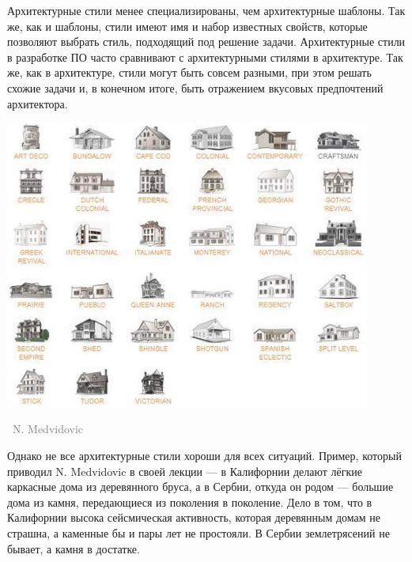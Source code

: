 \documentclass[a5paper]{article}
\newlength\Colsep
\newcommand{\attribution}[1] {
    \vspace{-4mm}\begin{flushright}\begin{scriptsize}\textcolor{gray}
    {\textcopyright\, #1}\end{scriptsize}\end{flushright}
}
\begin{document}
\noindent\begin{minipage}{\textwidth}
    \begin{minipage}[c][6cm][c]{\dimexpr0.5\textwidth-0.5\Colsep\relax}
        Архитектурные стили менее специализированы, чем архитектурные шаблоны. Так же, как и шаблоны, стили имеют имя и набор известных свойств, которые позволяют выбрать стиль, подходящий под решение задачи. Архитектурные стили в разработке ПО часто сравнивают с архитектурными стилями в архитектуре. Так же, как в архитектуре, стили могут быть совсем разными, при этом решать схожие задачи и, в конечном итоге, быть отражением вкусовых предпочтений архитектора.
    \end{minipage}\hfill
    \begin{minipage}[c][6cm][c]{\dimexpr0.5\textwidth-0.5\Colsep\relax}
        \includegraphics[width=0.9\textwidth]{buildingStyles.png}
        \attribution{N. Medvidovic}
    \end{minipage}%
\end{minipage}

Однако не все архитектурные стили хороши для всех ситуаций. Пример, который приводил N. Medvidovic в своей лекции --- в Калифорнии делают лёгкие каркасные дома из деревянного бруса, а в Сербии, откуда он родом --- большие дома из камня, передающиеся из поколения в поколение. Дело в том, что в Калифорнии высока сейсмическая активность, которая деревянным домам не страшна, а каменные бы и пары лет не простояли. В Сербии землетрясений не бывает, а камня в достатке.
\end{document}
